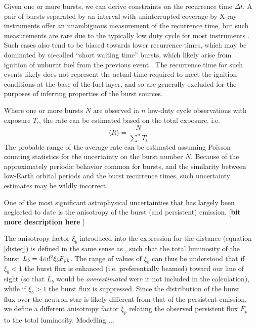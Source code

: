 \documentclass{aastex63}
\begin{document}
Given one or more bursts, we can derive constraints on the recurrence time $\Delta t$. A pair of bursts separated by an interval with uninterrupted coverage by X-ray instruments offer an unambiguous measurement of the recurrence time, but such measurements are rare due to the typically low duty cycle for most instruments \cite[e.g.][]{minbar}.
%
Such cases also tend to be biased towards lower recurrence times, which may be dominated by so-called ``short waiting time'' bursts, which likely arise from ignition of unburnt fuel from the previous event \cite[]{keek10}. The recurrence time for such events likely does not represent the actual time required to meet the ignition conditions at the base of the fuel layer, and so are generally excluded for the purposes of inferring properties of the burst sources.

Where one or more bursts $N$ are observed in $n$ low-duty cycle observations with exposure $T_i$, the rate can be estimated based on the total exposure, i.e.
\begin{equation}
\langle R\rangle = \frac{N}{\sum^n T_i}
\end{equation}
The probable range of the average rate can be estimated assuming Poisson counting statistics for the uncertainty on the burst number $N$. Because of the approximately periodic behavior common for bursts, and the similarity between low-Earth orbital periods and the burst recurrence times, such uncertainty estimates may be wildly incorrect.

One of the most significant astrophysical uncertainties that has largely been neglected to date is the anisotropy of the burst (and persistent) emission.
[{\bf bit more description here }]

The anisotropy factor $\xi_b$ introduced into the expression for the distance (equation  \ref{disteq}) is defined in the same sense as \citep{fuji88}, such that the total luminosity of the burst $L_b=4\pi d^2\xi_b F_{\rm pk}$. The range of values of $\xi_b$ can thus be understood that if $\xi_b<1$ the burst flux is enhanced (i.e. preferentially beamed) toward our line of sight (so that $L_b$ would be {\it overestimated} were it not included in the calculation), while if $\xi_b>1$ the burst flux is suppressed.
%
Since the distribution of the burst flux over the neutron star is likely different from that of the persistent emission, we define a different anisotropy factor $\xi_p$ relating the observed persistent flux $F_p$ to the total luminosity. Modelling \cite[]{he16}...
\end{document}
